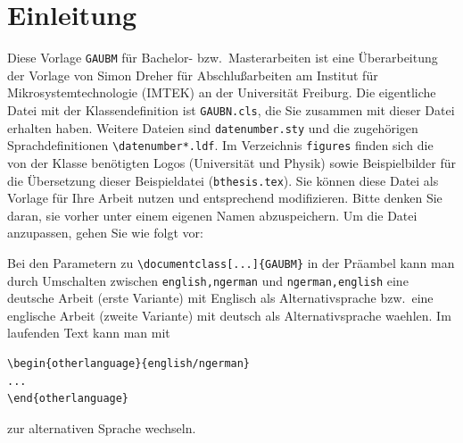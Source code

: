 \documentclass[bachelor,       %
               twoside,        %
               BCOR10mm,       %
               ngerman,english  %
               ]{GAUBM}
\begin{document}
\mainmatter   %

\chapter{Einleitung}
Diese Vorlage \verb!GAUBM!
f{\"u}r Bachelor- bzw.\ Masterarbeiten ist eine {\"U}berarbeitung der
Vorlage von Simon Dreher f{\"u}r Abschlu{\ss}arbeiten am
Institut f{\"u}r Mikrosystemtechnologie (IMTEK)
an der Universit{\"a}t Freiburg. Die eigentliche Datei mit der Klassendefinition
ist \verb!GAUBN.cls!, die Sie zusammen mit dieser Datei erhalten haben. Weitere
Dateien sind \verb!datenumber.sty! und die zugeh{\"o}rigen Sprachdefinitionen
\verb!\datenumber*.ldf!. Im Verzeichnis \verb!figures! finden sich die
von der Klasse ben{\"o}tigten Logos (Universit{\"a}t und Physik) sowie Beispielbilder
f{\"u}r die {\"U}bersetzung dieser Beispieldatei (\verb!bthesis.tex!).
Sie k{\"o}nnen diese Datei als Vorlage f{\"u}r Ihre Arbeit nutzen und entsprechend
modifizieren. Bitte denken Sie daran, sie vorher unter einem eigenen Namen
abzuspeichern.
Um die Datei anzupassen, gehen Sie wie folgt vor:

Bei den Parametern zu \verb!\documentclass[...]{GAUBM}! in der Pr{\"a}ambel
kann man durch Umschalten
zwischen \verb!english,ngerman! und \verb!ngerman,english! eine
deutsche Arbeit (erste Variante) mit Englisch als Alternativsprache bzw.\ eine
englische Arbeit (zweite Variante) mit deutsch als Alternativsprache
waehlen. Im laufenden Text kann man mit 
\begin{verbatim}
\begin{otherlanguage}{english/ngerman}
...
\end{otherlanguage}
\end{verbatim}
zur alternativen Sprache wechseln.
\end{document}
